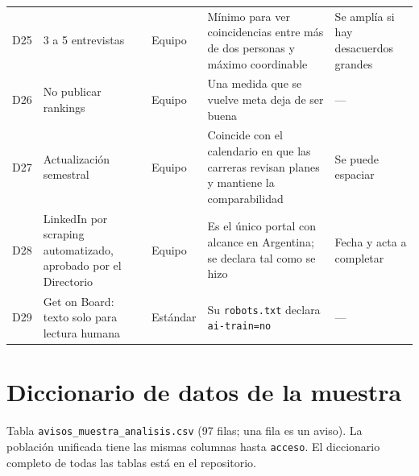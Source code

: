 \documentclass[11pt,a4paper]{article}
\begin{document}
\begin{footnotesize}
\begin{longtable}{@{}c L{2.9cm} L{1.9cm} L{4.6cm} L{3.4cm}@{}}
D25 & 3 a 5 entrevistas & Equipo & Mínimo para ver coincidencias entre más de dos personas y máximo coordinable & Se amplía si hay desacuerdos grandes\\
D26 & No publicar rankings & Equipo & Una medida que se vuelve meta deja de ser buena \cite{strathern1997} & ---\\
D27 & Actualización semestral & Equipo & Coincide con el calendario en que las carreras revisan planes y mantiene la comparabilidad & Se puede espaciar\\
D28 & LinkedIn por scraping automatizado, aprobado por el Directorio & Equipo & Es el único portal con alcance en Argentina; se declara tal como se hizo & Fecha y acta a completar\\
D29 & Get on Board: texto solo para lectura humana & Estándar & Su \texttt{robots.txt} declara \texttt{ai-train=no} & ---\\
\bottomrule
\end{longtable}
\end{footnotesize}

\section{Diccionario de datos de la muestra}\label{anx:datos}
Tabla \texttt{avisos\_muestra\_analisis.csv} (97 filas; una fila es un aviso). La población unificada tiene las mismas columnas hasta \texttt{acceso}. El diccionario completo de todas las tablas está en el repositorio.
\end{document}

